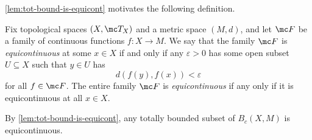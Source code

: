 \documentclass[../notes.tex]{subfiles}
\begin{document}
\autoref{lem:tot-bound-is-equicont} motivates the following definition.
\begin{definition}[Equicontinuous]
	Fix topological spaces $(X,\mc T_X)$ and a metric space $(M,d)$, and let $\mc F$ be a family of continuous functions $f\colon X\to M$. We say that the family $\mc F$ is \textit{equicontinuous} at some $x\in X$ if and only if any $\varepsilon>0$ has some open subset $U\subseteq X$ such that $y\in U$ has
	\[d(f(y),f(x))<\varepsilon\]
	for all $f\in \mc F$. The entire family $\mc F$ is \textit{equicontinuous} if any only if it is equicontinuous at all $x\in X$.
\end{definition}
\begin{example}
	By \autoref{lem:tot-bound-is-equicont}, any totally bounded subset of $B_c(X,M)$ is equicontinuous.
\end{example}
\end{document}
